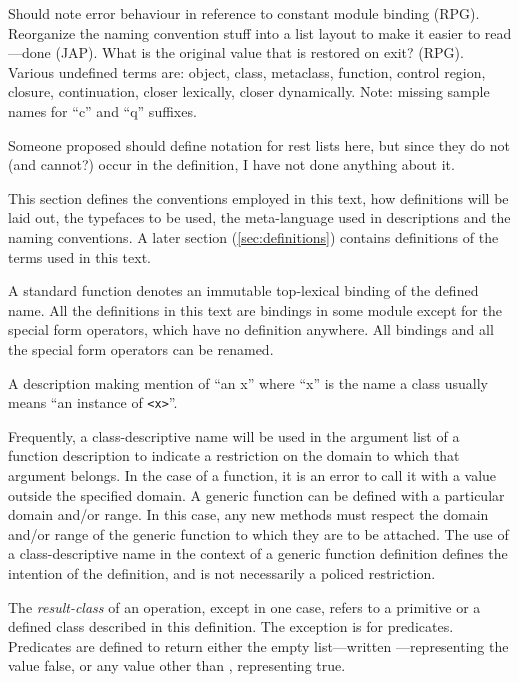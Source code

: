 %
\label{conventions}
\begin{optPrivate}
    Should note error behaviour in reference to constant module binding (RPG).
    Reorganize the naming convention stuff into a list layout to make it easier
    to read---done (JAP).  What is the original value that is restored on exit?
    (RPG).  Various undefined terms are: object, class, metaclass, function,
    control region, closure, continuation, closer lexically, closer dynamically.
    Note: missing sample names for ``c'' and ``q'' suffixes.

    Someone proposed should define notation for rest lists here, but since they
    do not (and cannot?) occur in the definition, I have not done anything about
    it.
\end{optPrivate}
%
\begin{optDefinition}
This section defines the conventions employed in this text, how
definitions will be laid out, the typefaces to be used, the
meta-language used in descriptions and the naming conventions.  A
later section (\ref{sec:definitions}) contains definitions of the
terms used in this text.

A standard function denotes an
immutable top-lexical binding of the defined name.  All the definitions in this
text are bindings in some module except for the special form operators, which
have no definition anywhere.  All bindings and all the special form operators
can be renamed.
%
\begin{note}
    A description making mention of ``an x'' where ``x'' is the name a
    class usually means ``an instance of {\tt <x>}''.
\end{note}
%
Frequently, a class-descriptive name will be used in the argument list of a
function description to indicate a restriction on the domain to which that
argument belongs.  In the case of a function, it is an error to call it with a
value outside the specified domain.  A generic function can be defined with a
particular domain and/or range.  In this case, any new methods must respect the
domain and/or range of the generic function to which they are to be attached.
The use of a class-descriptive name in the context of a generic function
definition defines the intention of the definition, and is not necessarily a
policed restriction.

The {\em result-class} of an operation, except in one case, refers to a
primitive or a defined class described in this definition.  The exception is for
predicates.  Predicates are defined to return either the empty list---written
\nil---representing the  value false, or
any value other than \nil, representing true.
\end{optDefinition}
